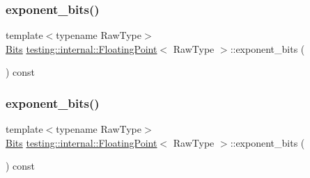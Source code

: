 \mbox{\label{classtesting_1_1internal_1_1_floating_point_af6bf8fab8df572ecb137a3516ff390ae}} 
\subsubsection{\texorpdfstring{exponent\_bits()}{exponent\_bits()}\hspace{0.1cm}{\footnotesize\ttfamily [1/3]}}
{\footnotesize\ttfamily template$<$typename Raw\+Type$>$ \\
\mbox{\hyperlink{classtesting_1_1internal_1_1_floating_point_abf228bf6cd48f12c8b44c85b4971a731}{Bits}} \mbox{\hyperlink{classtesting_1_1internal_1_1_floating_point}{testing\+::internal\+::\+Floating\+Point}}$<$ Raw\+Type $>$\+::exponent\+\_\+bits (\begin{DoxyParamCaption}{ }\end{DoxyParamCaption}) const\hspace{0.3cm}{\ttfamily [inline]}}

\mbox{\label{classtesting_1_1internal_1_1_floating_point_af6bf8fab8df572ecb137a3516ff390ae}} 
\subsubsection{\texorpdfstring{exponent\_bits()}{exponent\_bits()}\hspace{0.1cm}{\footnotesize\ttfamily [2/3]}}
{\footnotesize\ttfamily template$<$typename Raw\+Type$>$ \\
\mbox{\hyperlink{classtesting_1_1internal_1_1_floating_point_abf228bf6cd48f12c8b44c85b4971a731}{Bits}} \mbox{\hyperlink{classtesting_1_1internal_1_1_floating_point}{testing\+::internal\+::\+Floating\+Point}}$<$ Raw\+Type $>$\+::exponent\+\_\+bits (\begin{DoxyParamCaption}{ }\end{DoxyParamCaption}) const\hspace{0.3cm}{\ttfamily [inline]}}


